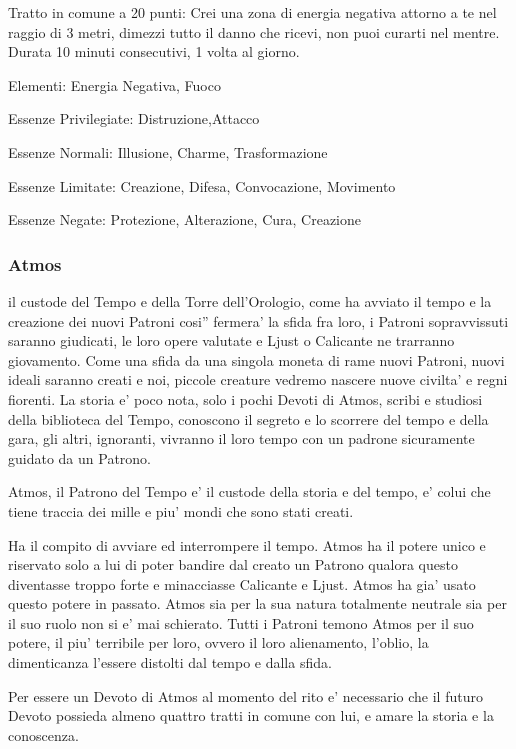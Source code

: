 \documentclass[a4paper,11pt,twoside,openany]{book}
\begin{document}
{Tratto in comune a 20 punti: Crei una zona di energia negativa attorno a te nel raggio di 3 metri, dimezzi tutto il danno che ricevi, non puoi curarti nel mentre. Durata 10 minuti consecutivi, 1 volta al giorno.

\bigskip

Elementi: Energia Negativa, Fuoco

\bigskip

Essenze Privilegiate: Distruzione,Attacco

Essenze Normali: Illusione, Charme, Trasformazione

Essenze Limitate: Creazione, Difesa, Convocazione, Movimento

Essenze Negate: Protezione, Alterazione, Cura, Creazione

\subsubsection{Atmos}

\label{atmos}

il custode del Tempo e della Torre dell'Orologio, come ha avviato il tempo e la creazione dei nuovi Patroni cosi'' fermera' la sfida fra loro, i Patroni sopravvissuti saranno giudicati, le loro opere valutate e Ljust o Calicante ne trarranno giovamento. Come una sfida da una singola moneta di rame nuovi Patroni, nuovi ideali saranno creati e noi, piccole creature vedremo nascere nuove civilta' e regni fiorenti. La storia e' poco nota, solo i pochi Devoti di Atmos, scribi e studiosi della biblioteca del Tempo, conoscono il segreto e lo scorrere del tempo e della gara, gli altri, ignoranti, vivranno il loro tempo con un padrone sicuramente guidato da un Patrono.

Atmos, il Patrono del Tempo e' il custode della storia e del tempo, e' colui che tiene traccia dei mille e piu' mondi che sono stati creati.

Ha il compito di avviare ed interrompere il tempo. Atmos ha il potere unico e riservato solo a lui di poter bandire dal creato un Patrono qualora questo diventasse troppo forte e minacciasse Calicante e Ljust. Atmos ha gia' usato questo potere in passato. Atmos sia per la sua natura totalmente neutrale sia per il suo ruolo non si e' mai schierato. Tutti i Patroni temono Atmos per il suo potere, il piu' terribile per loro, ovvero il loro alienamento, l'oblio, la dimenticanza l'essere distolti dal tempo e dalla sfida.

Per essere un Devoto di Atmos al momento del rito e' necessario che il futuro Devoto possieda almeno quattro tratti in comune con lui, e amare la storia e la conoscenza.

}
\end{document}
